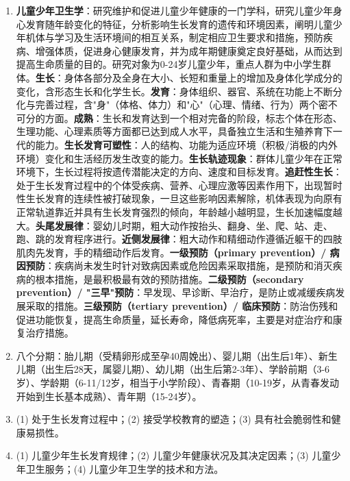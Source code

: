 {\begin{enumerate}[leftmargin=*, itemsep=5pt]
    \item \textbf{儿童少年卫生学}：研究维护和促进儿童少年健康的一门学科，研究儿童少年身心发育随年龄变化的特征，分析影响生长发育的遗传和环境因素，阐明儿童少年机体与学习及生活环境间的相互关系，制定相应卫生要求和措施，预防疾病、增强体质，促进身心健康发育，并为成年期健康奠定良好基础，从而达到提高生命质量的目的。研究对象为0-24岁儿童少年，重点人群为中小学生群体。\textbf{生长}：身体各部分及全身在大小、长短和重量上的增加及身体化学成分的变化，含形态生长和化学生长。\textbf{发育}：身体组织、器官、系统在功能上不断分化与完善过程，含"身"（体格、体力）和"心"（心理、情绪、行为）两个密不可分的方面。\textbf{成熟}：生长和发育达到一个相对完备的阶段，标志个体在形态、生理功能、心理素质等方面都已达到成人水平，具备独立生活和生殖养育下一代的能力。\textbf{生长发育可塑性}：人的结构、功能为适应环境（积极/消极的内外环境）变化和生活经历发生改变的能力。\textbf{生长轨迹现象}：群体儿童少年在正常环境下，生长过程将按遗传潜能决定的方向、速度和目标发育。\textbf{追赶性生长}：处于生长发育过程中的个体受疾病、营养、心理应激等因素作用下，出现暂时性生长发育的连续性被打破现象，一旦这些影响因素解除，机体表现为向原有正常轨道靠近并具有生长发育强烈的倾向，年龄越小越明显，生长加速幅度越大。\textbf{头尾发展律}：婴幼儿时期，粗大动作按抬头、翻身、坐、爬、站、走、跑、跳的发育程序进行。\textbf{近侧发展律}：粗大动作和精细动作遵循近躯干的四肢肌肉先发育，手的精细动作后发育。\textbf{一级预防（primary prevention）/ 病因预防}：疾病尚未发生时针对致病因素或危险因素采取措施，是预防和消灭疾病的根本措施，是最积极最有效的预防措施。\textbf{二级预防（secondary prevention）/ "三早"预防}：早发现、早诊断、早治疗，是防止或减缓疾病发展采取的措施。\textbf{三级预防（tertiary prevention）/ 临床预防}：防治伤残和促进功能恢复，提高生命质量，延长寿命，降低病死率，主要是对症治疗和康复治疗措施。

    \item 八个分期：胎儿期（受精卵形成至孕40周娩出）、婴儿期（出生后1年）、新生儿期（出生后28天，属婴儿期）、幼儿期（出生后第2-3年）、学龄前期（3-6岁）、学龄期（6-11/12岁，相当于小学阶段）、青春期（10-19岁，从青春发动开始到生长基本成熟）、青年期（15-24岁）。

    \item (1) 处于生长发育过程中；(2) 接受学校教育的塑造；(3) 具有社会脆弱性和健康易损性。

    \item (1) 儿童少年生长发育规律；(2) 儿童少年健康状况及其决定因素；(3) 儿童少年卫生服务；(4) 儿童少年卫生学的技术和方法。


\end{enumerate}}
